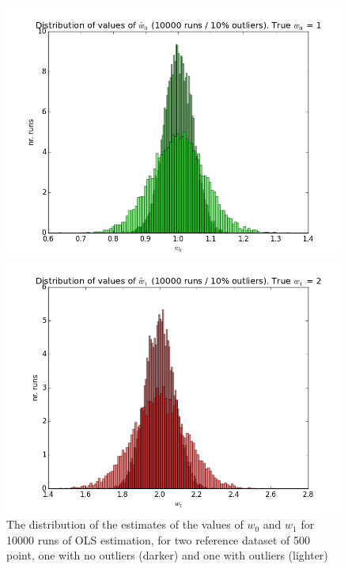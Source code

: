 \begin{figure}[h]
\centering
\begin{minipage}{.5\textwidth}
  \centering
  \includegraphics[width=1.0\linewidth]{chapter_lad/ols_w0_with_and_without_outliers.png}
\end{minipage}%
\begin{minipage}{.5\textwidth}
  \centering
  \includegraphics[width=1.0\linewidth]{chapter_lad/ols_w1_with_and_without_outliers.png}
\end{minipage}
  \label{fig.ols_estimates_with_and_with_no_outliers}
  \caption{The distribution of the estimates of the values of $w_0$ and $w_1$ for 10000 runs of OLS estimation, for two reference dataset of 500 point, one with no outliers (darker) and one with outliers (lighter)}
\end{figure}

